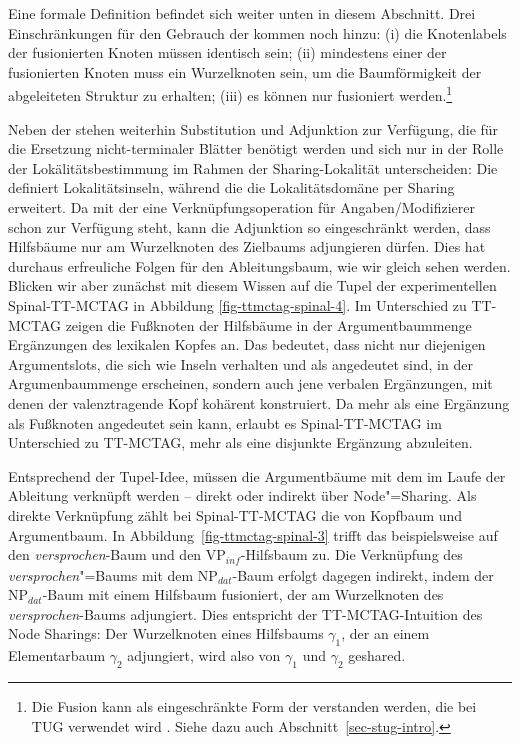 Eine formale Definition befindet sich weiter unten in diesem Abschnitt. Drei Einschränkungen für den Gebrauch der  kommen noch hinzu: (i) die Knotenlabels der fusionierten Knoten müssen identisch sein; (ii) mindestens einer der fusionierten Knoten muss ein Wurzelknoten sein, um die Baumförmigkeit der abgeleiteten Struktur zu erhalten; (iii) es können nur  fusioniert werden.\footnote{Die Fusion kann als eingeschränkte Form der  verstanden werden, die bei TUG verwendet wird \citep{Popowich:89,Gerdes:04}. Siehe dazu auch Abschnitt~\ref{sec-stug-intro}.} 

Neben der  stehen weiterhin Substitution und Adjunktion zur Verfügung, die für die Ersetzung nicht-terminaler Blätter benötigt werden und sich nur in der Rolle der Lokälitätsbestimmung im Rahmen der Sharing-Lokalität unterscheiden: Die  definiert Lokalitätsinseln, während die  die Lokalitätsdomäne per Sharing erweitert. Da mit der  eine Verknüpfungsoperation für Angaben/Modifizierer schon zur Verfügung steht, kann die Adjunktion so eingeschränkt werden, dass Hilfsbäume nur am Wurzelknoten des Zielbaums adjungieren dürfen. Dies hat durchaus erfreuliche Folgen für den Ableitungsbaum, wie wir gleich sehen werden. Blicken wir aber zunächst mit diesem Wissen auf die Tupel der experimentellen Spinal-TT-MCTAG in Abbildung \ref{fig-ttmctag-spinal-4}. 
Im Unterschied zu TT-MCTAG zeigen die Fu\ss knoten der Hilfsbäume in der Argumentbaummenge Ergänzungen des lexikalen Kopfes an. Das bedeutet, dass nicht nur diejenigen Argumentslots, die sich wie Inseln verhalten und als  angedeutet sind, in der Argumenbaummenge erscheinen,  sondern auch jene verbalen Ergänzungen, mit denen der valenztragende Kopf kohärent konstruiert. Da mehr als eine Ergänzung als Fu\ss knoten angedeutet sein kann, erlaubt es Spinal-TT-MCTAG im Unterschied zu TT-MCTAG, mehr als eine disjunkte Ergänzung abzuleiten.  

Entsprechend der Tupel-Idee, müssen die Argumentbäume mit dem  im Laufe der Ableitung verknüpft werden -- direkt oder indirekt über Node"=Sharing. Als direkte Verknüpfung zählt bei Spinal-TT-MCTAG die  von Kopfbaum und Argumentbaum. In Abbildung~\ref{fig-ttmctag-spinal-3} trifft das beispielsweise auf den {\it versprochen}-Baum und den VP$_{\mathit{inf}}$-Hilfsbaum zu. Die Verknüpfung des {\it versprochen}"=Baums mit dem NP$_{\mathit{dat}}$-Baum erfolgt dagegen indirekt, indem der NP$_{\mathit{dat}}$-Baum mit einem Hilfsbaum fusioniert, der am Wurzelknoten des {\it versprochen}-Baums adjungiert. Dies entspricht der TT-MCTAG-Intuition des Node Sharings: Der Wurzelknoten eines Hilfsbaums $\gamma_1$, der an einem Elementarbaum $\gamma_2$ adjungiert, wird also von $\gamma_1$ und $\gamma_2$ geshared.


